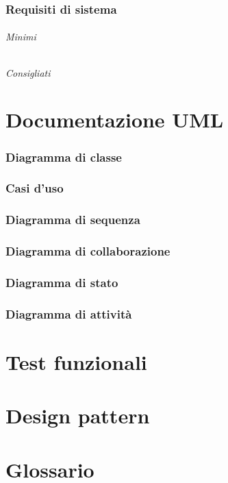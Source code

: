 \documentclass{article}
\begin{document}
	\section{Requisiti di sistema}
	\paragraph{Minimi}
	\paragraph{Consigliati}
	\newpage
	\part{Documentazione UML}
	\section{Diagramma di classe}
	\newpage
	\section{Casi d'uso}
	
	\newpage
	\section{Diagramma di sequenza}
	\newpage
	\section{Diagramma di collaborazione}
	\newpage
	\section{Diagramma di stato}
	\newpage
	\section{Diagramma di attività}
	\newpage
	\part{Test funzionali}
	\newpage
	\part{Design pattern}
	\newpage
	\appendix
	\part{Glossario}
\end{document}
